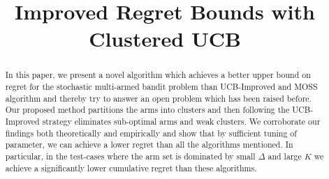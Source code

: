 \documentclass[11pt,letterpaper,english]{article}
\begin{document}
\title{Improved Regret Bounds with Clustered UCB}

\author{}


\renewcommand\Authands{ and }

\date{}

\maketitle

\begin{abstract}
In this paper, we present a novel algorithm which achieves a better upper bound on regret for the stochastic multi-armed bandit problem than UCB-Improved and MOSS algorithm and thereby try to answer an open problem which has been raised before. Our proposed method partitions the arms into clusters and then following the UCB-Improved strategy eliminates sub-optimal arms and weak clusters. We corroborate our findings both theoretically and empirically and show that by sufficient tuning of parameter, we can achieve a lower regret than all the algorithms mentioned. In particular, in the test-cases where the arm set is dominated by small $\Delta$ and large $K$ we achieve a significantly lower cumulative regret than these algorithms.




\end{abstract}
\end{document}
